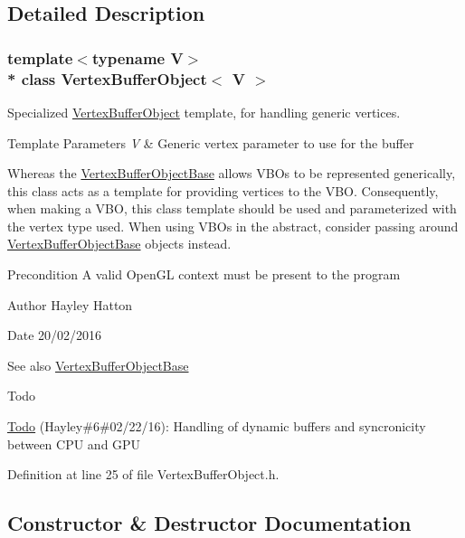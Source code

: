\subsection{Detailed Description}
\subsubsection*{template$<$typename V$>$\\*
class Vertex\+Buffer\+Object$<$ V $>$}

Specialized \hyperlink{class_vertex_buffer_object}{Vertex\+Buffer\+Object} template, for handling generic vertices. 


\begin{DoxyTemplParams}{Template Parameters}
{\em V} & Generic vertex parameter to use for the buffer\\
\hline
\end{DoxyTemplParams}
Whereas the \hyperlink{class_vertex_buffer_object_base}{Vertex\+Buffer\+Object\+Base} allows V\+B\+Os to be represented generically, this class acts as a template for providing vertices to the V\+BO. Consequently, when making a V\+BO, this class template should be used and parameterized with the vertex type used. When using V\+B\+Os in the abstract, consider passing around \hyperlink{class_vertex_buffer_object_base}{Vertex\+Buffer\+Object\+Base} objects instead.

\begin{DoxyPrecond}{Precondition}
A valid Open\+GL context must be present to the program 
\end{DoxyPrecond}
\begin{DoxyAuthor}{Author}
Hayley Hatton 
\end{DoxyAuthor}
\begin{DoxyDate}{Date}
20/02/2016 
\end{DoxyDate}
\begin{DoxySeeAlso}{See also}
\hyperlink{class_vertex_buffer_object_base}{Vertex\+Buffer\+Object\+Base} 
\end{DoxySeeAlso}
\begin{DoxyRefDesc}{Todo}
\item[\hyperlink{todo__todo000007}{Todo}](Hayley\#6\#02/22/16)\+: Handling of dynamic buffers and syncronicity between C\+PU and G\+PU \end{DoxyRefDesc}


Definition at line 25 of file Vertex\+Buffer\+Object.\+h.



\subsection{Constructor \& Destructor Documentation}

